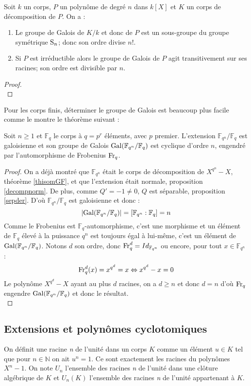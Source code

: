 \documentclass[a4paper]{article} %
\numberwithin{section}{part}
\numberwithin{equation}{section}
\newcommand\nroot[1]{\textit{#1}\up{\textit{ième}}}
\newcommand\GF[1]{\mathbb{F}_{#1}}
\newcommand\NN{\mathbb{N}}
\begin{document}
\begin{thm} Soit $k$ un corps, $P$ un polynôme de degré $n$ dans $k[X]$ et $K$ 
un corps de décomposition de $P$. On a :
\begin{enumerate}
\item Le groupe de Galois de $K/k$ et donc de $P$ est un sous-groupe du groupe
symétrique $\textup{S}_n$; donc son ordre divise $n!$.
\item Si $P$ est irréductible alors le groupe de Galois de $P$ agit
transitivement sur ses racines; son ordre est divisible par $n$.
\end{enumerate}
\end{thm}
\begin{proof}
\cite[Chap. IX, p.~206]{Pol}\\
\end{proof}

Pour les corps finis, déterminer le groupe de Galois est beaucoup plus facile
comme le montre le théorème suivant :

\begin{thm}
Soit $n\geq1$ et $\GF{q}$ le corps à $q=p^r$ éléments, avec $p$ premier.
L'extension $\GF{q^n}/\GF{q}$ est galoisienne et son groupe de Galois
$\textup{Gal}(\GF{q^n}/\GF{q})$ est cyclique d'ordre $n$, engendré par 
l'automorphisme de Frobenius $\textup{Fr}_q$.
\end{thm}
\begin{proof}
On a déjà montré que $\GF{q^n}$ était le corps de décomposition de $X^{q^n} -
X$, théorème \ref{thisomGF}, et que l'extension était normale, proposition 
\ref{decompnorm}. De plus, comme $Q' = -1 \neq 0$, $Q$ est séparable,
proposition \ref{sepder}.  D'où $\GF{q^n}/\GF{q}$ est galoisienne et donc :
\[|\textup{Gal}(\GF{q^n}/\GF{q})| = [\GF{q^n}:\GF{q}] = n\]
Comme le Frobenius est $\GF{q}$-automorphisme, c'est une morphisme et un élément
de $\GF{q}$ élevé à la puissance $q^n$ est toujours égal à lui-même, c'est un
élément de $\textup{Gal}(\GF{q^n}/\GF{q})$. Notons $d$ son ordre, donc
$\textup{Fr}_q^d = Id_{\GF{q^n}}$ ou encore, pour tout $x\in\GF{q^n}$ :
\[\textup{Fr}_q^d(x) = x^{q^d} = x \Leftrightarrow x^{q^d} - x = 0\]
Le polynôme $X^{q^d} - X$ ayant au plus $d$ racines, on a $d\geq n$ et donc $d =
n$ d'où $\textup{Fr}_q$ engendre $\textup{Gal}(\GF{q^n}/\GF{q})$ et donc le
résultat.\\
\end{proof}

\subsection{Extensions et polynômes cyclotomiques}
On définit une racine \nroot{n} de l'unité dans un corps $K$ 
comme un élément $u\in K$ tel que pour $n\in\NN$ on ait $u^n = 1$. Ce 
sont exactement les racines du polynômes $X^n - 1$.
On note $U_n$ l'ensemble des racines \nroot{n} de l'unité dans une clôture 
algébrique de $K$ et $U_n(K)$ l'ensemble des racines \nroot{n} de l'unité 
appartenant à $K$.
\end{document}
